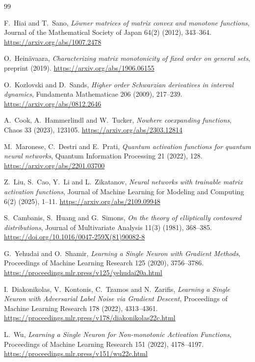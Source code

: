 \documentclass[11pt]{article}
\begin{document}
\begin{thebibliography}{99}
\let\oldbibitem\bibitem
\renewcommand{\bibitem}{\par\oldbibitem}
\setlength{\itemsep}{1pt}
\small
{}
F.~Hiai and T.~Sano,
\emph{L\"owner matrices of matrix convex and monotone functions},
Journal of the Mathematical Society of Japan 64(2) (2012), 343--364.
\url{https://arxiv.org/abs/1007.2478}

O.~Hein\"avaara,
\emph{Characterizing matrix monotonicity of fixed order on general sets},
preprint (2019).
\url{https://arxiv.org/abs/1906.06155}

O.~Kozlovski and D.~Sands,
\emph{Higher order Schwarzian derivatives in interval dynamics},
Fundamenta Mathematicae 206 (2009), 217--239.
\url{https://arxiv.org/abs/0812.2646}

A.~Cook, A.~Hammerlindl and W.~Tucker,
\emph{Nowhere coexpanding functions},
Chaos 33 (2023), 123105.
\url{https://arxiv.org/abs/2303.12814}

M.~Maronese, C.~Destri and E.~Prati,
\emph{Quantum activation functions for quantum neural networks},
Quantum Information Processing 21 (2022), 128.
\url{https://arxiv.org/abs/2201.03700}

Z.~Liu, S.~Cao, Y.~Li and L.~Zikatanov,
\emph{Neural networks with trainable matrix activation functions},
Journal of Machine Learning for Modeling and Computing 6(2) (2025), 1--11.
\url{https://arxiv.org/abs/2109.09948}

S.~Cambanis, S.~Huang and G.~Simons,
\emph{On the theory of elliptically contoured distributions},
Journal of Multivariate Analysis 11(3) (1981), 368--385.
\url{https://doi.org/10.1016/0047-259X(81)90082-8}

G.~Yehudai and O.~Shamir,
\emph{Learning a Single Neuron with Gradient Methods},
Proceedings of Machine Learning Research 125 (2020), 3756--3786.
\url{https://proceedings.mlr.press/v125/yehudai20a.html}

I.~Diakonikolas, V.~Kontonis, C.~Tzamos and N.~Zarifis,
\emph{Learning a Single Neuron with Adversarial Label Noise via Gradient Descent},
Proceedings of Machine Learning Research 178 (2022), 4313--4361.
\url{https://proceedings.mlr.press/v178/diakonikolas22c.html}

L.~Wu,
\emph{Learning a Single Neuron for Non-monotonic Activation Functions},
Proceedings of Machine Learning Research 151 (2022), 4178--4197.
\url{https://proceedings.mlr.press/v151/wu22c.html}


\end{thebibliography}
\end{document}
